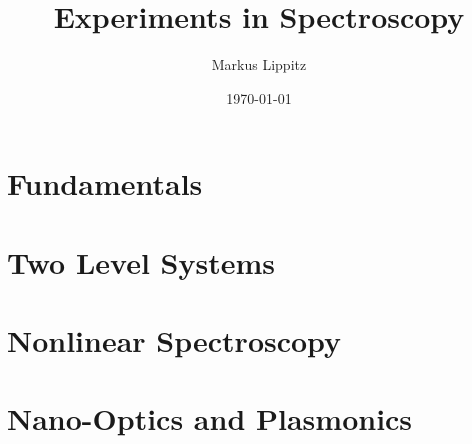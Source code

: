 \documentclass[notoc,nofonts,a4paper,twoside,nobib]{tufte-book}
\begin{document}
  \tikzexternaldisable


\title{Experiments in Spectroscopy}

\author{Markus Lippitz}
\date{\today}


\maketitle


%
\tableofcontents

%

%
\part{Fundamentals}






%
%
\part{Two Level Systems}



%


%
\part{Nonlinear Spectroscopy}







%
%
%
\part{Nano-Optics and Plasmonics}



%
%

\printbibliography
\end{document}
